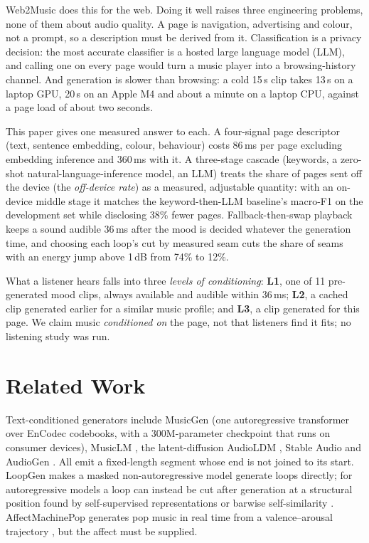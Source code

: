 \documentclass[conference]{IEEEtran}
\begin{document}
Web2Music does this for the web. Doing it well raises three engineering
problems, none of them about audio quality. A page is navigation, advertising
and colour, not a prompt, so a description must be derived from it.
Classification is a privacy decision: the most accurate classifier is a hosted
large language model (LLM), and calling one on every page would turn a music
player into a browsing-history channel. And generation is slower than browsing:
a cold 15\,s clip takes 13\,s on a laptop GPU, 20\,s on an Apple M4 and about a
minute on a laptop CPU, against a page load of about two seconds.

This paper gives one measured answer to each. A four-signal page descriptor
(text, sentence embedding, colour, behaviour) costs 86\,ms per page excluding
embedding inference and 360\,ms with it. A three-stage cascade (keywords, a
zero-shot natural-language-inference model, an LLM) treats the share of pages
sent off the device (the \emph{off-device rate}) as a measured, adjustable
quantity: with an on-device middle stage it matches the keyword-then-LLM
baseline's macro-F1 on the development set while disclosing 38\% fewer pages.
Fallback-then-swap playback keeps a sound audible 36\,ms after the mood is
decided whatever the generation time, and choosing each loop's cut by measured
seam cuts the share of seams with an energy jump above 1\,dB from 74\% to 12\%.

What a listener hears falls into three \emph{levels of conditioning}: \textbf{L1},
one of 11 pre-generated mood clips, always available and audible within 36\,ms;
\textbf{L2}, a cached clip generated earlier for a similar music profile; and
\textbf{L3}, a clip generated for this page. We claim music \emph{conditioned on}
the page, not that listeners find it fits; no listening study was run.

\section{Related Work}
\label{sec:related}

Text-conditioned generators include MusicGen \cite{musicgen} (one autoregressive
transformer over EnCodec \cite{encodec} codebooks, with a 300M-parameter
checkpoint that runs on consumer devices), MusicLM \cite{musiclm}, the
latent-diffusion AudioLDM \cite{audioldm}, Stable Audio \cite{stableaudio} and
AudioGen \cite{audiogen}. All emit a fixed-length segment whose end is not
joined to its start. LoopGen \cite{loopgen} makes a masked non-autoregressive
model generate loops directly; for autoregressive models a loop can instead be
cut after generation at a structural position found by self-supervised
representations \cite{buisson} or barwise self-similarity \cite{marmoret}.
AffectMachinePop \cite{affectmachine} generates pop music in real time from a
valence--arousal trajectory \cite{kang}, but the affect must be supplied.
\end{document}
